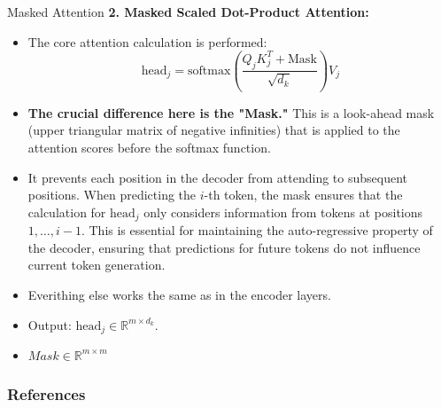 \documentclass{beamer}
\begin{document}
\begin{frame}{Masked Attention}
  \textbf{2. Masked Scaled Dot-Product Attention:}
  \begin{itemize}
      \item The core attention calculation is performed:
      $$ \text{head}_j = \text{softmax}\left(\frac{Q_j K_j^T + \text{Mask}}{\sqrt{d_k}}\right)V_j $$
      \item \textbf{The crucial difference here is the "Mask."} This is a look-ahead mask (upper triangular matrix of negative infinities) that is applied to the attention scores before the softmax function.
      \item It prevents each position in the decoder from attending to subsequent positions. When predicting the $i$-th token, the mask ensures that the calculation for $\text{head}_j$ only considers information from tokens at positions $1, \dots, i-1$. This is essential for maintaining the 
      auto-regressive property of the decoder, ensuring that predictions for future tokens do not influence current token generation.
      \item Everithing else works the same as in the encoder layers.
      \item Output: $\text{head}_j \in \mathbb{R}^{m \times d_k}$.
      \item $Mask \in \mathbb{R}^{m \times m}$
  \end{itemize}
\end{frame}


\begin{frame}{}
  
\end{frame}

\begin{frame}[allowframebreaks]
    \frametitle{References}
    \printbibliography
\end{frame}
\end{document}
